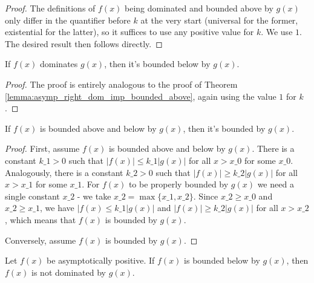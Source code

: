 \begin{proof}
    \leanok 
    The definitions of $f(x)$ being dominated and bounded above by $g(x)$ only differ
    in the quantifier before $k$ at the very start (universal for the former, existential
    for the latter), so it suffices to use any positive value for $k$. We use $1$. 
    The desired result then follows directly.
\end{proof}

\begin{lemma}
    \label{lemma:asymp_left_dom_imp_bounded_below}
    \leanok
    If $f(x)$ dominates $g(x)$, then it's bounded below by $g(x)$.
\end{lemma}

\begin{proof}
    \leanok
    The proof is entirely analogous to the proof of Theorem 
    \ref{lemma:asymp_right_dom_imp_bounded_above}, again using the value 
    $1$ for $k$.
\end{proof}
\begin{theorem}
    \label{thm:asymp_bounded_above_below_iff}
    \leanok
    If $f(x)$ is bounded above and below by $g(x)$, then it's bounded by $g(x)$.
\end{theorem}

\begin{proof}
    \leanok
    First, assume $f(x)$ is bounded above and below by $g(x)$. There is a constant
    $k\_1 > 0$ such that $|f(x)| \le k\_1 |g(x)|$ for all $x > x\_0$ for some $x\_0$.
    Analogously, there is a constant $k\_2 > 0$ such that $|f(x)| \ge k\_2 |g(x)|$ 
    for all $x > x\_1$ for some $x\_1$. For $f(x)$ to be properly bounded by $g(x)$ 
    we need a single constant $x\_2$ - we take $x\_2 = \max{\{x\_1, x\_2\}}$. Since 
    $x\_2 \ge x\_0$ and $x\_2 \ge x\_1$, we have $|f(x) \le k\_1 |g(x)|$ and 
    $|f(x)| \ge k\_2 |g(x)|$ for all $x > x\_2$, which means that $f(x)$ is bounded
    by $g(x)$.

    Conversely, assume $f(x)$ is bounded by $g(x)$.
\end{proof}

\begin{lemma}
    \label{thm:asymp_bounded_below_imp_not_right_dom}
    \leanok
    Let $f(x)$ be asymptotically positive. If $f(x)$ is bounded below by $g(x)$, then $f(x)$ 
    is not dominated by $g(x)$.
\end{lemma}


